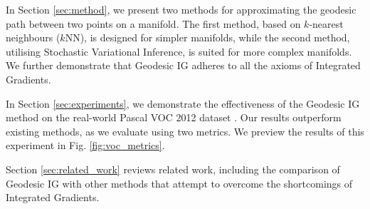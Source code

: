 In Section \ref{sec:method}, we present two methods for approximating the geodesic path between two points on a manifold. The first method, based on $k$-nearest neighbours ($k$NN), is designed for simpler manifolds, while the second method, utilising Stochastic Variational Inference, is suited for more complex manifolds. We further demonstrate that Geodesic IG adheres to all the axioms of Integrated Gradients.


In Section \ref{sec:experiments}, we demonstrate the effectiveness of the Geodesic IG method on the real-world Pascal VOC 2012 dataset \cite{pascal-voc-2012}. Our results outperform existing methods, as we evaluate using two metrics. We preview the results of this experiment in Fig. \ref{fig:voc_metrics}.

Section \ref{sec:related_work} reviews related work, including the comparison of Geodesic IG with other methods that attempt to overcome the shortcomings of Integrated Gradients.